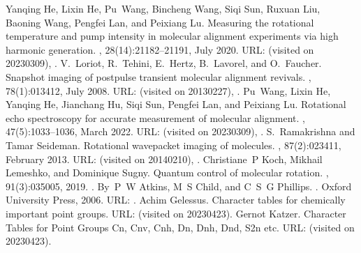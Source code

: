 \documentclass[letterpaper,table,10pt,english]{jupyterBook}
\begin{document}
\begin{sphinxthebibliography}{10}
\sphinxAtStartPar
Yanqing He, Lixin He, Pu Wang, Bincheng Wang, Siqi Sun, Ruxuan Liu, Baoning Wang, Pengfei Lan, and Peixiang Lu. Measuring the rotational temperature and pump intensity in molecular alignment experiments via high harmonic generation. , 28(14):21182–21191, July 2020. URL:  (visited on 2023\sphinxhyphen{}03\sphinxhyphen{}09), .
\sphinxAtStartPar
V. Loriot, R. Tehini, E. Hertz, B. Lavorel, and O. Faucher. Snapshot imaging of postpulse transient molecular alignment revivals. , 78(1):013412, July 2008. URL:  (visited on 2013\sphinxhyphen{}02\sphinxhyphen{}27), .
\sphinxAtStartPar
Pu Wang, Lixin He, Yanqing He, Jianchang Hu, Siqi Sun, Pengfei Lan, and Peixiang Lu. Rotational echo spectroscopy for accurate measurement of molecular alignment. , 47(5):1033–1036, March 2022. URL:  (visited on 2023\sphinxhyphen{}03\sphinxhyphen{}09), .
\sphinxAtStartPar
S. Ramakrishna and Tamar Seideman. Rotational wave\sphinxhyphen{}packet imaging of molecules. , 87(2):023411, February 2013. URL:  (visited on 2014\sphinxhyphen{}02\sphinxhyphen{}10), .
\sphinxAtStartPar
Christiane P Koch, Mikhail Lemeshko, and Dominique Sugny. Quantum control of molecular rotation. , 91(3):035005, 2019. .
\sphinxAtStartPar
By P W Atkins, M S Child, and C S G Phillips. . Oxford University Press, 2006. URL: .
\sphinxAtStartPar
Achim Gelessus. Character tables for chemically important point groups. URL:  (visited on 2023\sphinxhyphen{}04\sphinxhyphen{}23).
\sphinxAtStartPar
Gernot Katzer. Character Tables for Point Groups Cn, Cnv, Cnh, Dn, Dnh, Dnd, S2n etc. URL:  (visited on 2023\sphinxhyphen{}04\sphinxhyphen{}23).
\end{sphinxthebibliography}







\renewcommand{\indexname}{Index}
\printindex
\end{document}
